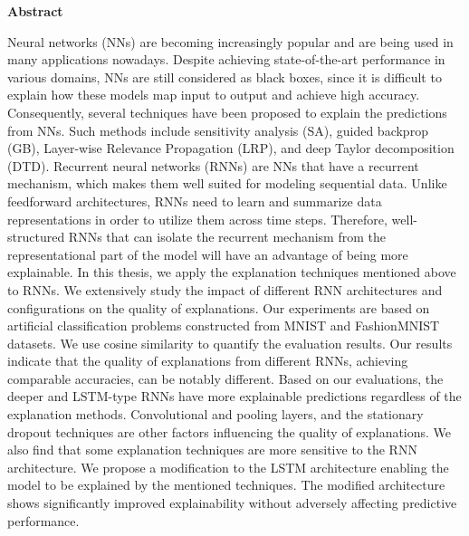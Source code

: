 \thispagestyle{empty}
\vspace*{1.0cm}

\begin{center}
    \textbf{Abstract}
\end{center}

\vspace*{0.5cm}

\noindent

Neural networks (NNs) are becoming increasingly popular and are being used in many applications nowadays. Despite achieving state-of-the-art performance in various domains, NNs are still considered as black boxes, since it is difficult to explain how these models map input to output and achieve high accuracy.  Consequently, several techniques have been proposed to explain the  predictions from NNs. Such methods include sensitivity analysis (SA), guided backprop (GB), Layer-wise Relevance Propagation (LRP), and deep Taylor decomposition (DTD).  Recurrent neural networks (RNNs) are NNs that have a recurrent mechanism, which makes them well suited for modeling sequential data.  Unlike feedforward architectures, RNNs need to learn and summarize data representations in order to utilize them across time steps. Therefore, well-structured RNNs that can isolate the recurrent mechanism from the representational part of the model will have an advantage of being more explainable. In this thesis, we apply the explanation techniques mentioned above to RNNs. We extensively study the impact of different RNN architectures and configurations on the quality of explanations. Our experiments are based on artificial classification problems constructed from MNIST and FashionMNIST datasets. We use cosine similarity to quantify the evaluation results. Our results indicate that the quality of explanations from different RNNs, achieving comparable accuracies, can be notably different. Based on our evaluations, the deeper and LSTM-type RNNs have more explainable predictions regardless of the explanation methods.  Convolutional and pooling layers, and the stationary dropout techniques are other factors influencing the quality of explanations. We also find that some explanation techniques are more sensitive to the RNN architecture. We propose a modification to the LSTM architecture enabling the model to be explained by the mentioned techniques. The modified architecture shows significantly improved explainability without adversely affecting predictive performance.

%

